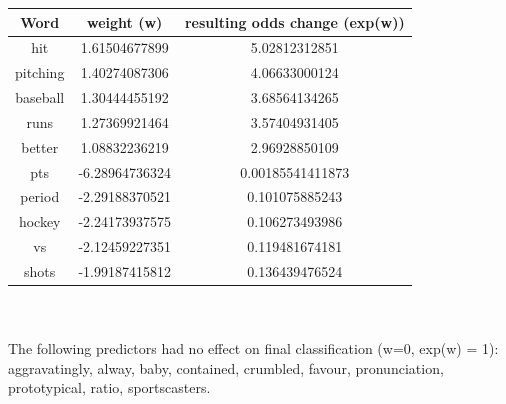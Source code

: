 \documentclass[11pt, oneside]{article}   	%
\begin{document}
\begin{tabular}{*3{c}}\hline
Word & weight (w) & resulting odds change (exp(w))\\ \hline
hit & 1.61504677899 & 5.02812312851 \\
pitching & 1.40274087306 & 4.06633000124 \\
baseball & 1.30444455192 & 3.68564134265 \\
runs & 1.27369921464 & 3.57404931405 \\
better & 1.08832236219 & 2.96928850109 \\
pts & -6.28964736324 & 0.00185541411873 \\
period & -2.29188370521 & 0.101075885243 \\
hockey & -2.24173937575 & 0.106273493986 \\
vs & -2.12459227351 & 0.119481674181 \\
shots & -1.99187415812 & 0.136439476524 \\
\end{tabular}
\\
\\
The following predictors had no effect on final classification (w=0, exp(w) = 1):\\
aggravatingly, alway, baby, contained, crumbled, favour, pronunciation, prototypical, ratio, sportscasters.
\end{document}
